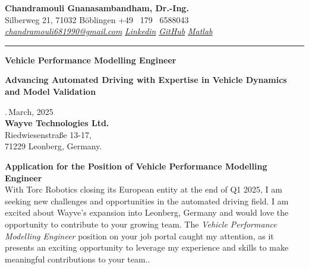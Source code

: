 \documentclass[a4paper,10pt]{article}
\newcommand{\link}[1]{{\textit{#1}}}
\begin{document}
\thispagestyle{plain}

\begin{center}
    {\Large \textbf{Chandramouli Gnanasambandham, Dr.-Ing.}}\\ 
    
    \vspace{0.2cm}
    \small Silberweg 21, 71032 B\"oblingen \hfill  \bullet  \hfill  +49 \ 179 \ 6588043 \hfill \bullet  \hfill
    \textup{\href{mailto:chandramouli681990@gmail.com}{\link{chandramouli681990@gmail.com}}} \hfill \bullet \hfill
    \textup{\href{https://www.linkedin.com/in/ganasambandhamc/}{\link{Linkedin}}} \hfill \bullet \hfill
    \textup{\href{https://github.com/chandramouli6890}{\link{GitHub}}} \hfill \bullet \hfill
    \textup{\href{https://de.mathworks.com/matlabcentral/profile/authors/4267772}{\link{Matlab}}}

    \vspace{-0.2cm}
    {\rule{\linewidth}{0.8pt}}

    \vspace{0.2cm}
    {\Large \textbf{Vehicle Performance Modelling Engineer}}
    
    \vspace{0.1cm}
    \colorbox{gray!40}{%
        \parbox{0.99\textwidth}{%
            \centering \textcolor{highlightcolor}{\textbf{Advancing Automated Driving with Expertise in Vehicle Dynamics and Model Validation}}
        }%
    }
\end{center}

\vspace{0.5cm}
.\,March, 2025\\

{\noindent
\textbf{Wayve Technologies Ltd.}\\
Riedwiesenstraße 13-17,\\
71229 Leonberg, Germany.\\
}

\noindent \textbf{Application for the Position of Vehicle Performance Modelling Engineer} \\

\noindent With Torc Robotics closing its European entity at the end of Q1 2025,
I am seeking new challenges and opportunities in the automated driving field. I
am excited about Wayve’s expansion into Leonberg, Germany and would love the
opportunity to contribute to your growing team. The \textit{Vehicle Performance
Modelling Engineer} position on your job portal caught my attention, as it
presents an exciting opportunity to leverage my experience and skills to make
meaningful contributions to your team..\\
\end{document}

